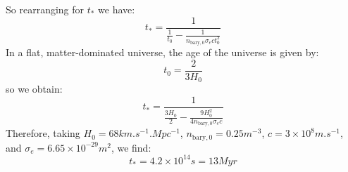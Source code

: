 So rearranging for $t_*$ we have:
\begin{equation}
    t_* = \frac{1}{\frac{1}{t_0} - \frac{1}{n_{\text{bary}, 0}\sigma_ec t_0^2}}
\end{equation}
In a flat, matter-dominated universe, the age of the universe is given by:
\begin{equation}
    t_0 = \frac{2}{3H_0}
\end{equation}
so we obtain:
\begin{equation}
    t_* = \frac{1}{\frac{3H_0}{2} - \frac{9H_0^2}{4n_{\text{bary}, 0}\sigma_ec}}
\end{equation}
Therefore, taking $H_0 = 68 \si{km.s^{-1}.Mpc^{-1}}$, $n_{\text{bary}, 0} = 0.25\si{m^{-3}}$, $c = 3 \times 10^{8}\si{m.s^{-1}}$, and $\sigma_e = 6.65 \times 10^{-29}\si{m^2}$, we find:
\begin{equation}
    \boxed{t_* = 4.2 \times 10^{14}\si{s} = 13 \si{Myr}}
\end{equation}